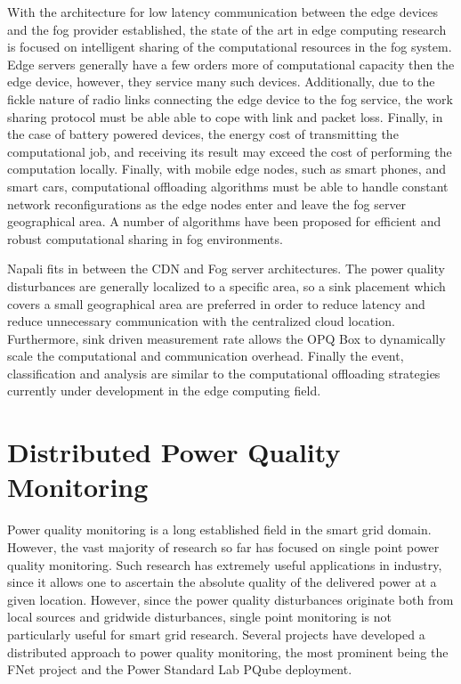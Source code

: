 With the architecture for low latency communication between the edge devices and the fog provider established, the state of the art in edge computing research is focused on intelligent sharing of the computational resources in the fog system. Edge servers generally have a few orders more of computational capacity then the edge device, however, they service many such devices. Additionally, due to the fickle nature of radio links connecting the edge device to the fog service, the work sharing protocol must be able able to cope with link and packet loss. Finally, in the case of battery powered devices, the energy cost of transmitting the computational job, and receiving its result may exceed the cost of performing the computation locally. Finally, with mobile edge nodes, such as smart phones, and smart cars, computational offloading algorithms must be able to handle constant network reconfigurations as the edge nodes enter and leave the fog server geographical area. A number of algorithms have been proposed for efficient and robust computational sharing in fog environments. \cite{oueis2015fog} \cite{wang2015mobiscud} \cite{wang2013mobile}

Napali fits in between the CDN and Fog server architectures. The power quality disturbances are generally localized to a specific area, so a sink placement which covers a small geographical area are preferred in order to reduce latency and reduce unnecessary communication with the centralized cloud location. Furthermore, sink driven measurement rate allows the OPQ Box to dynamically scale the computational and communication overhead. Finally the event, classification and analysis are similar to the computational offloading strategies currently under development in the edge computing field.

\section{Distributed Power Quality Monitoring}

Power quality monitoring is a long established field in the smart grid domain. However, the vast majority of research so far has focused on single point power quality monitoring.\cite{silva2017development} Such research has extremely useful applications in industry, since it allows one to ascertain the absolute quality of the delivered power at a given location. However, since the power quality disturbances originate both from local sources and gridwide disturbances, single point monitoring is not particularly useful for smart grid research. Several projects have developed a distributed approach to power quality monitoring, the most prominent being the FNet project and the Power Standard Lab PQube deployment. 

